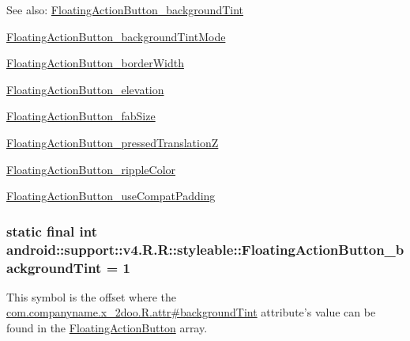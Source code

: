 \begin{Desc}
\item[See also:]\hyperlink{classandroid_1_1support_1_1v4_1_1_r_1_1styleable_3539f4438fb7bb45fef80a07f3887d5a}{FloatingActionButton\_\-backgroundTint} 

\hyperlink{classandroid_1_1support_1_1v4_1_1_r_1_1styleable_c8d02e9d241d20ca06568db8e4b38c1c}{FloatingActionButton\_\-backgroundTintMode} 

\hyperlink{classandroid_1_1support_1_1v4_1_1_r_1_1styleable_b0ddfe0b4c79c8941063e2650af4a9e3}{FloatingActionButton\_\-borderWidth} 

\hyperlink{classandroid_1_1support_1_1v4_1_1_r_1_1styleable_21d6aad3ec0a6bd9aa987ca685e4c166}{FloatingActionButton\_\-elevation} 

\hyperlink{classandroid_1_1support_1_1v4_1_1_r_1_1styleable_47e11e2375cc45dd871a519e2df82ea3}{FloatingActionButton\_\-fabSize} 

\hyperlink{classandroid_1_1support_1_1v4_1_1_r_1_1styleable_c267ca537f8a9cb13d80afdbd16d457d}{FloatingActionButton\_\-pressedTranslationZ} 

\hyperlink{classandroid_1_1support_1_1v4_1_1_r_1_1styleable_a03ae583d77273636cb0e624e75b3148}{FloatingActionButton\_\-rippleColor} 

\hyperlink{classandroid_1_1support_1_1v4_1_1_r_1_1styleable_ae0dde9e7a05bead4f8562d2d2696661}{FloatingActionButton\_\-useCompatPadding} \end{Desc}
\hypertarget{classandroid_1_1support_1_1v4_1_1_r_1_1styleable_3539f4438fb7bb45fef80a07f3887d5a}{
\subsubsection[{FloatingActionButton\_\-backgroundTint}]{\setlength{\rightskip}{0pt plus 5cm}static final int android::support::v4.R.R::styleable::FloatingActionButton\_\-backgroundTint = 1}}
\label{classandroid_1_1support_1_1v4_1_1_r_1_1styleable_3539f4438fb7bb45fef80a07f3887d5a}


This symbol is the offset where the \hyperlink{classcom_1_1companyname_1_1x__2doo_1_1_r_1_1attr_8893d15496aa78adf7f63c789d335c3b}{com.companyname.x\_\-2doo.R.attr\#backgroundTint} attribute's value can be found in the \hyperlink{classandroid_1_1support_1_1v4_1_1_r_1_1styleable_51a0276d7190a1195d58170b1623ab3c}{FloatingActionButton} array.

